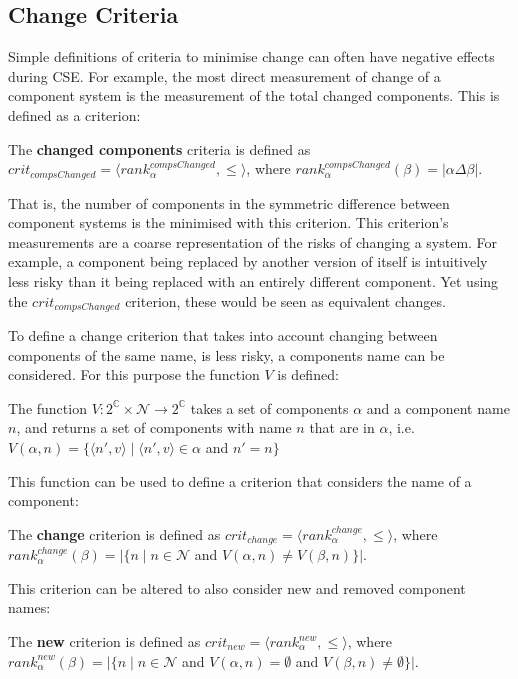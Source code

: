 \subsection{Change Criteria}
Simple definitions of criteria to minimise change can often have negative effects during CSE.
For example, the most direct measurement of change of a component system is the measurement of the total changed components.
This is defined as a \modelname criterion:
\begin{defs}
	The \textbf{changed components} criteria is defined as $crit_{compsChanged} = \langle rank^{compsChanged}_{\alpha}, \leq \rangle$,
	where $rank^{compsChanged}_{\alpha}(\beta) = |\alpha \Delta \beta|$.
\end{defs}
That is, the number of components in the symmetric difference between component systems is the minimised with this criterion.
This criterion's measurements are a coarse representation of the risks of changing a system.
For example, a component being replaced by another version of itself is intuitively less risky than it being replaced with an entirely different component.  
Yet using the $crit_{compsChanged}$ criterion, these would be seen as equivalent changes.

To define a change criterion that takes into account changing between components of the same name, is less risky, a components name can be considered.
For this purpose the function $V$ is defined:
\begin{defs}
The function $V: 2^{\mathbb{C}} \times \mathcal{N} \rightarrow 2^{\mathbb{C}}$ takes a set of components $\alpha$ and a component name $n$, and returns a set of components with name $n$ that are in $\alpha$,
i.e. $V(\alpha,n) = \{\langle n',v \rangle \mid \langle n',v \rangle \in \alpha $ and $ n' = n \}$
\end{defs}

This function can be used to define a criterion that considers the name of a component:
\begin{defs}
	The \textbf{change} criterion is defined as $crit_{change} = \langle rank^{change}_{\alpha}, \leq \rangle$,
	where $rank^{change}_{\alpha}(\beta) = |\{n \mid n \in \mathcal{N}$ and $V(\alpha,n) \neq V(\beta,n) \}|$.
\end{defs}

This criterion can be altered to also consider new and removed component names:
\begin{defs}
	The \textbf{new} criterion is defined as $crit_{new} = \langle rank^{new}_{\alpha}, \leq \rangle$,
	where $rank^{new}_{\alpha}(\beta) = |\{n \mid n \in \mathcal{N}$ and $V(\alpha,n) = \emptyset$ and $V(\beta,n) \neq \emptyset\}|$.
\end{defs}

